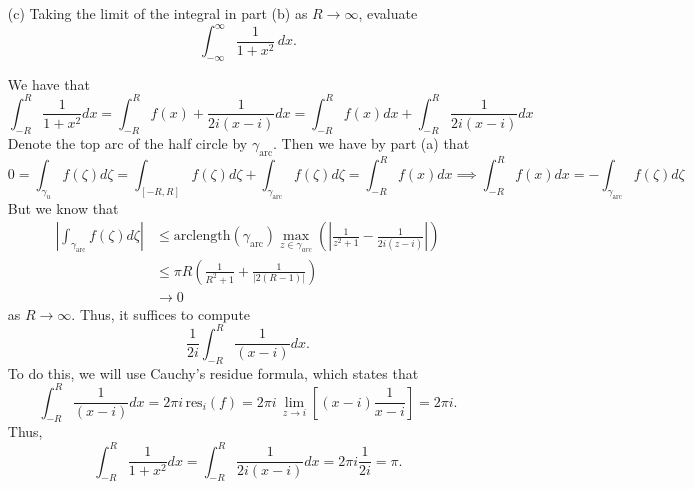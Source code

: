 \documentclass[11pt]{article}
\begin{document}
\begin{enumerate}
    \item[(c)] Taking the limit of the integral in part (b) as \( R \to \infty \), evaluate
    \[
    \int_{-\infty}^\infty \frac{1}{1 + x^2} \, dx.
    \]
    \begin{solution}
We have that 
\[\int_{-R}^R \frac{1}{1 + x^2}dx = \int_{-R}^R f(x) + \frac{1}{2i(x - i)}dx = \int_{-R}^R f(x)dx + \int_{-R}^R \frac{1}{2i(x-i)}dx\]
Denote the top arc of the half circle by $\gamma_{\text{arc}}.$ Then we have by part (a) that
\[0 = \int_{\gamma_u}f(\zeta)d\zeta = \int_{[-R, R]} f(\zeta)d\zeta + \int_{\gamma_{\text{arc}}}f(\zeta)d\zeta = \int_{-R}^R f(x)dx \implies \int_{-R}^R f(x)dx= - \int_{\gamma_{\text{arc}}}f(\zeta)d\zeta\]
But we know that 
\begin{align*}
    \left|\int_{\gamma_{\text{arc}}}f(\zeta)d\zeta\right| &\leq \text{arclength}(\gamma_{\text{arc}})\max_{z \in \gamma_{arc}}(|\frac{1}{z^2  + 1} - \frac{1}{2i(z-i)}|)\\
    &\leq \pi R (\frac{1}{R^2 + 1} + \frac{1}{|2(R -1)|})\\
    &\to 0
\end{align*}
as $R\to \infty.$ Thus, it suffices to compute 
\[\frac{1}{2i}\int_{-R}^R \frac{1}{(x-i)}dx.\] To do this, we will use Cauchy's residue formula, which states that 
\[\int_{-R}^R \frac{1}{(x-i)}dx = 2\pi i \,\text{res}_i(f) = 2\pi i\, \lim_{z\to i}\left[(x-i)\frac{1}{x-i}\right] = 2\pi i.\] Thus, 
\[\int_{-R}^R \frac{1}{1 + x^2}dx = \int_{-R}^R \frac{1}{2i(x-i)}dx = 2\pi i \frac{1}{2i } = \pi.\]
    \end{solution}
\end{enumerate}
\end{document}
